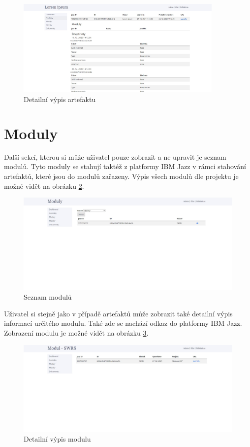 \documentclass[czech,master]{diploma}
\begin{document}
\begin{figure}[!ht]
    \centering
    \includegraphics[width=0.9\textwidth]{Diplomka/Figures/metrics_tool/artifacts_detail.jpg}
    \caption{Detailní výpis artefaktu}
    \label{fig:metrics_tool_artifacts_detail}
\end{figure}
\section{Moduly}
Další sekcí, kterou si může uživatel pouze zobrazit a ne upravit je seznam modulů. Tyto moduly se stahují taktéž z platformy IBM Jazz v rámci stahování artefaktů, které jsou do modulů zařazeny. Výpis všech modulů dle projektu je možné vidět na obrázku \ref{fig:metrics_tool_modules}.

\begin{figure}[!ht]
    \centering
    \includegraphics[width=1\textwidth]{Diplomka/Figures/metrics_tool/modules.jpg}
    \caption{Seznam modulů}
    \label{fig:metrics_tool_modules}
\end{figure}
Uživatel si stejně jako v případě artefaktů může zobrazit také detailní výpis informací určitého modulu. Také zde se nachází odkaz do platformy IBM Jazz. Zobrazení modulu je možné vidět na obrázku \ref{fig:metrics_tool_modules_detail}.


\begin{figure}[!ht]
    \centering
    \includegraphics[width=1\textwidth]{Diplomka/Figures/metrics_tool/modules_detail.jpg}
    \caption{Detailní výpis modulu}
    \label{fig:metrics_tool_modules_detail}
\end{figure}
\end{document}
